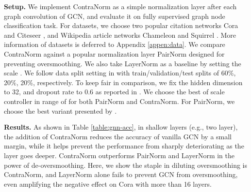 \documentclass{article}
\theoremstyle{definition}
\theoremstyle{remark}
\theoremstyle{theorem}
\begin{document}
\textbf{Setup.} We implement ContraNorm as a simple normalization layer after each graph convolution of GCN, and evaluate it on fully supervised graph node classification task. For datasets, we choose two popular citation networks Cora \citep{mccallum2000automating} and Citeseer \citep{giles1998citeseer}, and Wikipedia article networks Chameleon and Squirrel \citep{rozemberczki2021multi}. More information of datasets is deferred to Appendix \ref{appen:data}. We compare ContraNorm against a popular normalization layer PairNorm \citep{zhao2019pairnorm} designed for preventing oversmoothing. We also take LayerNorm as a baseline by setting the scale .  We follow data split setting in \citet{kipf2016semi} with train/validation/test splits of 60\%, 20\%, 20\%, respectively. To keep fair in comparison, we fix the hidden dimension to 32, and dropout rate to 0.6 as reported in \citet{zhao2019pairnorm}. We choose the best of scale controller  in range of  for both PairNorm and ContraNorm. For PairNorm, we choose the best variant presented by \citet{zhao2019pairnorm}.


\textbf{Results.} As shown in Table \ref{table:gnn-acc}, in shallow layers (e.g., two layer), the addition of ContraNorm reduces the accuracy of vanilla GCN by a small margin, while it helps prevent the performance from sharply deteriorating as the layer goes deeper. ContraNorm outperforms PairNorm and LayerNorm in the power of de-oversmoothing. Here, we show the staple in diluting oversmoothing is ContraNorm, and LayerNorm alone fails to prevent GCN from oversmoothing, even amplifying the negative effect on Cora with more than 16 layers.
\end{document}

